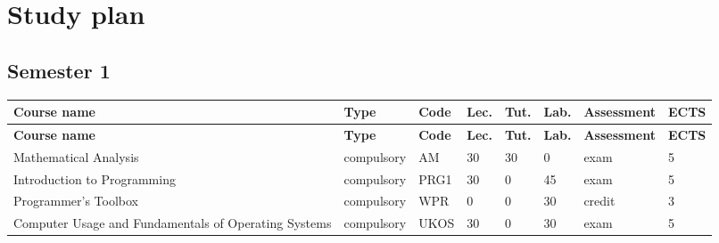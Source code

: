 \documentclass[12pt,a4paper]{article}
\newcommand{\thdrule}{\noalign{\global\setlength{\extrarowheight}{0pt}}}
\newcommand{\thdend}{\noalign{\global\setlength{\extrarowheight}{4pt}}}
\begin{document}
\newpage

\section{Study plan}

\bigskip

\subsection*{Semester 1}

{\scriptsize
\begin{longtable}{m{5.0cm}m{1.9cm}m{0.75cm}m{0.85cm}m{0.85cm}m{0.85cm}m{1.45cm}m{0.9cm}}
\thdrule\toprule
\rowcolor{pjatkRed}
{\color{white}\footnotesize\textbf{\vphantom{Ag}Course name}} & {\color{white}\footnotesize\textbf{\vphantom{Ag}Type}} & {\color{white}\footnotesize\textbf{\vphantom{Ag}Code}} & {\color{white}\footnotesize\textbf{\vphantom{Ag}Lec.}} & {\color{white}\footnotesize\textbf{\vphantom{Ag}Tut.}} & {\color{white}\footnotesize\textbf{\vphantom{Ag}Lab.}} & {\color{white}\footnotesize\textbf{\vphantom{Ag}Assessment}} & {\color{white}\footnotesize\textbf{\vphantom{Ag}ECTS}} \\
\midrule\thdend
\endfirsthead
\thdrule\toprule
\rowcolor{pjatkRed}
{\color{white}\footnotesize\textbf{\vphantom{Ag}Course name}} & {\color{white}\footnotesize\textbf{\vphantom{Ag}Type}} & {\color{white}\footnotesize\textbf{\vphantom{Ag}Code}} & {\color{white}\footnotesize\textbf{\vphantom{Ag}Lec.}} & {\color{white}\footnotesize\textbf{\vphantom{Ag}Tut.}} & {\color{white}\footnotesize\textbf{\vphantom{Ag}Lab.}} & {\color{white}\footnotesize\textbf{\vphantom{Ag}Assessment}} & {\color{white}\footnotesize\textbf{\vphantom{Ag}ECTS}} \\
\midrule\thdend
\endhead
\rowcolor{tableRowLight} Mathematical Analysis & {\scriptsize compulsory} & AM & 30 & 30 & 0 & {\scriptsize exam} & 5 \\
\rowcolor{tableRowAlt} Introduction to Programming & {\scriptsize compulsory} & PRG1 & 30 & 0 & 45 & {\scriptsize exam} & 5 \\
\rowcolor{tableRowLight} Programmer's Toolbox & {\scriptsize compulsory} & WPR & 0 & 0 & 30 & {\scriptsize credit} & 3 \\
\rowcolor{tableRowAlt} Computer Usage and Fundamentals of Operating Systems & {\scriptsize compulsory} & UKOS & 30 & 0 & 30 & {\scriptsize exam} & 5 \\

\end{longtable}}
\end{document}
